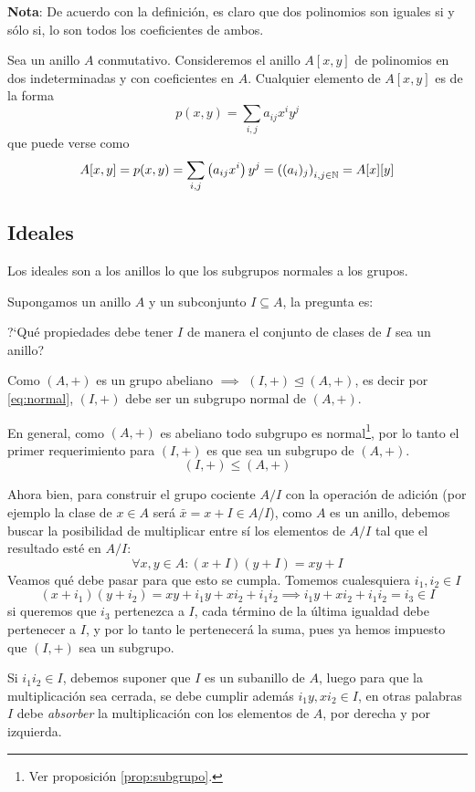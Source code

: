 \textbf{Nota}: De acuerdo con la definición, es claro que dos polinomios son iguales si y sólo si, lo son todos los coeficientes de ambos.

\begin{fmd-example}
	Sea un anillo $A$ conmutativo. Consideremos el anillo $A[x, y]$ de polinomios en dos indeterminadas y con coeficientes en $A$. Cualquier elemento de $A[x, y]$ es de la forma \[ p(x, y) = \sum_{i,j} a_{ij} x^i y^j\]
	que puede verse como
	\[ A[x, y] = p(x,y) = \sum_{i,j} \left(a_{ij} x^i\right) y^j = \left( (a_i)_j \right)_{i, j \in \mathbb{N}} = A[x][y] \]
\end{fmd-example}

\subsection{Ideales} \label{sec:ideales}

Los ideales son a los anillos lo que los subgrupos normales a los grupos.

Supongamos un anillo $A$ y un subconjunto $I \subseteq A$, la pregunta es:

?`Qué propiedades debe tener $I$ de manera el conjunto de clases de $I$ sea un anillo?

Como $(A, +)$ es un grupo abeliano $\implies$ $(I, +) \trianglelefteq (A, +)$, es decir por \eqref{eq:normal},  $(I, +)$ debe ser un subgrupo normal de $(A, +)$.

En general, como $(A, +)$ es abeliano todo subgrupo es normal\footnote{Ver proposición \ref{prop:subgrupo}.}, por lo tanto el primer requerimiento para $(I, +)$ es que sea un subgrupo de $(A, +)$.
\[ (I, +) \le (A, +) \]

Ahora bien, para construir el grupo cociente $A/I$ con la operación de adición (por ejemplo la clase de $x \in A$ será $\bar{x} = x + I \in A/I$), como $A$ es un anillo, debemos buscar la posibilidad de multiplicar entre sí los elementos de $A/I$ tal que el resultado esté en $A/I$:
\[ \forall x, y \in A: (x + I)(y + I) = x y + I \]
Veamos qué debe pasar para que esto se cumpla. Tomemos cualesquiera $i_1, i_2 \in I$
\[ (x + i_1) (y + i_2) = xy + i_1y + xi_2 + i_1i_2 \implies i_1y + xi_2 + i_1i_2 = i_3 \in I\]
si queremos que $i_3$ pertenezca a $I$, cada término de la última igualdad debe pertenecer a $I$, y por lo tanto le pertenecerá la suma, pues ya hemos impuesto que $(I, +)$ sea un subgrupo.

Si $i_1i_2 \in I$, debemos suponer que $I$ es un subanillo de $A$, luego para que la multiplicación sea cerrada, se debe cumplir además $i_1y, xi_2 \in I$, en otras palabras $I$ debe \textit{absorber} la multiplicación con los elementos de $A$, por derecha y por izquierda.

